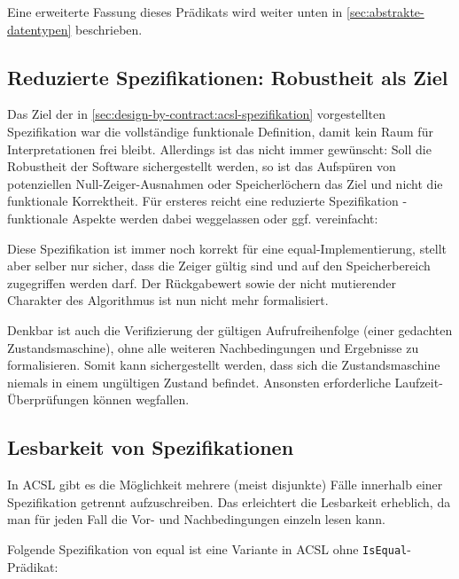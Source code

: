 Eine erweiterte Fassung dieses Prädikats wird weiter unten in 
\ref{sec:abstrakte-datentypen} beschrieben.



\subsection{Reduzierte Spezifikationen: Robustheit als Ziel}
\label{sec:design-by-contract:partielle-korrektheit}

Das Ziel der in \ref{sec:design-by-contract:acsl-spezifikation} vorgestellten Spezifikation war die
vollständige funktionale Definition, damit kein Raum für Interpretationen frei bleibt. Allerdings ist
das nicht immer gewünscht: Soll die Robustheit der Software sichergestellt werden, so ist das Aufspüren 
von potenziellen Null-Zeiger-Ausnahmen oder Speicherlöchern das Ziel und nicht die funktionale
Korrektheit. Für ersteres reicht eine reduzierte Spezifikation - funktionale Aspekte werden dabei 
weggelassen oder ggf. vereinfacht:


 
Diese Spezifikation ist immer noch korrekt für eine equal-Implementierung, stellt aber selber nur sicher,
dass die Zeiger gültig sind und auf den Speicherbereich zugegriffen werden darf. Der Rückgabewert sowie 
der nicht mutierender Charakter des Algorithmus ist nun nicht mehr formalisiert.

Denkbar ist auch die Verifizierung der gültigen Aufrufreihenfolge (einer gedachten Zustandsmaschine),
ohne alle weiteren Nachbedingungen und Ergebnisse zu formalisieren. Somit kann sichergestellt werden,
dass sich die Zustandsmaschine niemals in einem ungültigen Zustand befindet. Ansonsten erforderliche
Laufzeit-Überprüfungen können wegfallen.



\subsection{Lesbarkeit von Spezifikationen}
\label{sec:design-by-contract:behaviors}

In ACSL gibt es die Möglichkeit mehrere (meist disjunkte) Fälle innerhalb einer Spezifikation getrennt
aufzuschreiben. Das erleichtert die Lesbarkeit erheblich, da man für jeden Fall die Vor- und Nachbedingungen
einzeln lesen kann.

Folgende Spezifikation von equal ist eine Variante in ACSL ohne \lstinline{IsEqual}-Prädikat:

